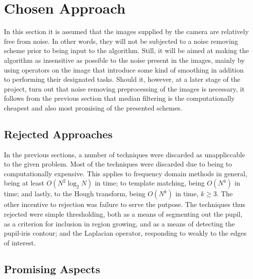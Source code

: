 
\section{Chosen Approach}
\label{eval:approach}

In this section it is assumed that the images supplied by the camera
are relatively free from noise.  In other words, they will not be
subjected to a noise removing scheme prior to being input to the
algorithm.  Still, it will be aimed at making the algorithm as
insensitive as possible to the noise present in the images, mainly by
using operators on the image that introduce some kind of smoothing in
addition to performing their designated tasks.  Should it, however, at
a later stage of the project, turn out that noise removing
preprocessing of the images is necessary, it follows from the previous
section that median filtering is the computationally cheapest and also
most promising of the presented schemes.

\subsection{Rejected Approaches}
\label{eval:approach:reject}

In the previous sections, a number of techniques were discarded as
unappliccable to the given problem.  Most of the techniques were
discarded due to being to computationally expensive.  This applies to
frequency domain methods in general, being at least
$O(N^{2}\log_{2}N)$ in time; to template matching, being $O(N^{4})$ in
time; and lastly, to the Hough transform, being $O(N^{k})$ in time,
$k\geq 3$.  The other incentive to rejection was failure to serve the
putpose.  The techniques thus rejected were simple thresholding, both
as a means of segmenting out the pupil, as a criterion for inclusion
in region growing, and as a means of detecting the pupil-iris contour;
and the Laplacian operator, responding to weakly to the edges of
interest.

\subsection{Promising Aspects}
\label{eval:approach:aspect}

